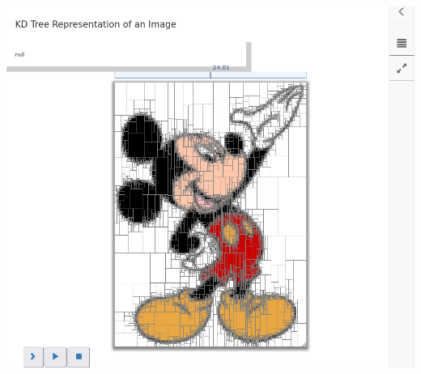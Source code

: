 \documentclass[aspectratio=169]{beamer}
\begin{document}
\begin{frame}
\begin{columns}
    \includegraphics[width=1.\linewidth]{viz_figs/ColorGrid3.png}
  \end{columns}
\end{frame}
\end{document}

